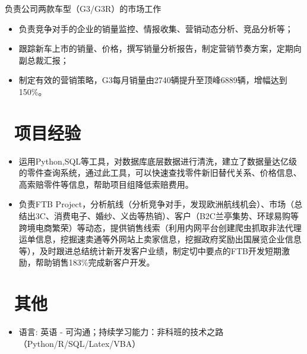 \documentclass{resume}
\begin{document}
负责公司两款车型（G3/G3R）的市场工作
\begin{itemize}
  \item 负责竞争对手的企业的销量监控、情报收集、营销动态分析、竞品分析等；
  \item 跟踪新车上市的销量、价格，撰写销量分析报告，制定营销节奏方案，定期向副总裁汇报；
  \item 制定有效的营销策略，G3每月销量由2740辆提升至顶峰6889辆，增幅达到150\%。
\end{itemize}


\section{\faCamera\ 项目经验}
\begin{itemize}[parsep=0.5ex]
  \item 运用Python,SQL等工具，对数据库底层数据进行清洗，建立了数据量达亿级的零件查询系统，通过此工具，可以快速查找零件新旧替代关系、价格信息、高索赔零件等信息，帮助项目组降低索赔费用。 
  \item 负责FTB Project，分析航线（分析竞争对手，发现欧洲航线机会）、市场（总结出3C、消费电子、婚纱、义齿等热销）、客户（B2C兰亭集势、环球易购等跨境电商繁荣）等动态，提供销售线索（利用内网平台创建爬虫抓取非法代理运单信息，挖掘速卖通等外网站上卖家信息，挖掘政府奖励出国展览企业信息等），及时跟进总结统计新开发客户业绩，制定切中要点的FTB开发短期激励，帮助销售183\%完成新客户开发。  
\end{itemize}


\section{\faDiamond\ 其他}
\begin{itemize}[parsep=0.5ex]
  \item 语言: 英语 - 可沟通；持续学习能力：非科班的技术之路（Python/R/SQL/Latex/VBA）
\end{itemize}

%
%
\end{document}
